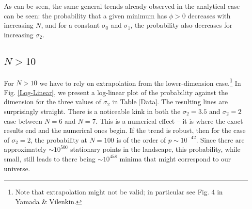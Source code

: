 \documentclass[12pt]{article}
\begin{document}
As can be seen, the same general trends already observed in the analytical case can be seen: the probability that a given minimum has $\phi > 0$ decreases with increasing $N$, and for a constant $\sigma_0$ and $\sigma_1$, the probability also decreases for increasing $\sigma_2$.


\subsection{$N > 10$}
For $N > 10$ we have to rely on extrapolation from the lower-dimension case.\footnote{Note that extrapolation might not be valid; in particular see Fig. 4 in Yamada \& Vilenkin.}  In Fig. \ref{Log-Linear}, we present a log-linear plot of the probability against the dimension for the three values of $\sigma_2$ in Table \ref{Data}. The resulting lines are surprisingly straight. There is a noticeable kink in both the $\sigma_2 = 3.5$ and $\sigma_2=2$ case between $N=6$ and $N=7$. This is a numerical effect -- it is where the exact results end and the numerical ones begin. If the trend is robust, then for the case of $\sigma_2=2$, the probability at $N=100$ is of the order of $p \sim 10^{-42}$. Since there are approximately $\sim 10^{500}$ stationary points in the landscape,\cite{Douglas} this probability, while small, still leads to there being $\sim 10^{458}$ minima that might correspond to our universe. %

\end{document}
